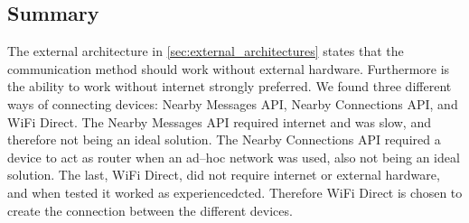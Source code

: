 \subsection{Summary}
The external architecture in \cref{sec:external_architectures} states that the communication method should work without external hardware.
Furthermore is the ability to work without internet strongly preferred.
We found three different ways of connecting devices: Nearby Messages API, Nearby Connections API, and WiFi Direct.
The Nearby Messages API required internet and was slow, and therefore not being an ideal solution.
The Nearby Connections API required a device to act as router when an ad--hoc network was used, also not being an ideal solution.
The last, WiFi Direct, did not require internet or external hardware, and when tested it worked as experiencedcted.
Therefore WiFi Direct is chosen to create the connection between the different devices. 
